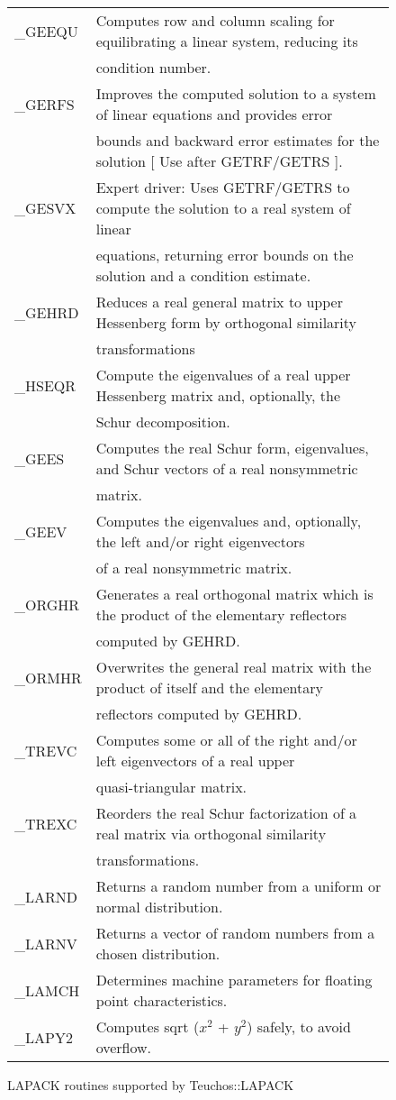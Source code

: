 \begin{figure}[hbt]
{{\begin{tabular}{|l||l|}
\_GEEQU & Computes row and column scaling for equilibrating a linear system, reducing its \\
 & condition number. \\\hline
\_GERFS & Improves the computed solution to a system of linear equations and provides error \\
 & bounds and backward error estimates for the solution [ Use after GETRF/GETRS ].\\\hline
\_GESVX & Expert driver:  Uses GETRF/GETRS to compute the solution to a real system of linear \\
 & equations, returning error bounds on the solution and a condition estimate. \\\hline
\_GEHRD & Reduces a real general matrix to upper Hessenberg form by orthogonal similarity \\
 & transformations \\\hline
\_HSEQR & Compute the eigenvalues of a real upper Hessenberg matrix and, optionally, the \\
 & Schur decomposition. \\\hline
\_GEES & Computes the real Schur form, eigenvalues, and Schur vectors of a real nonsymmetric \\
 & matrix. \\\hline
\_GEEV & Computes the eigenvalues and, optionally, the left and/or right eigenvectors \\
 & of a real nonsymmetric matrix. \\\hline
\_ORGHR & Generates a real orthogonal matrix which is the product of the elementary reflectors \\
 & computed by GEHRD. \\\hline
\_ORMHR & Overwrites the general real matrix with the product of itself and the elementary \\
 & reflectors computed by GEHRD. \\\hline
\_TREVC & Computes some or all of the right and/or left eigenvectors of a real upper \\
 & quasi-triangular matrix. \\\hline
\_TREXC & Reorders the real Schur factorization of a real matrix via orthogonal similarity \\
 & transformations. \\\hline
\_LARND & Returns a random number from a uniform or normal distribution. \\\hline
\_LARNV & Returns a vector of random numbers from a chosen distribution. \\\hline
\_LAMCH & Determines machine parameters for floating point characteristics. \\\hline
\_LAPY2 & Computes sqrt ($x^2$ + $y^2$) safely, to avoid overflow. \\\hline
\end{tabular}}}
\caption{LAPACK routines supported by Teuchos::LAPACK}\label{lapack_routines}
\end{figure}

